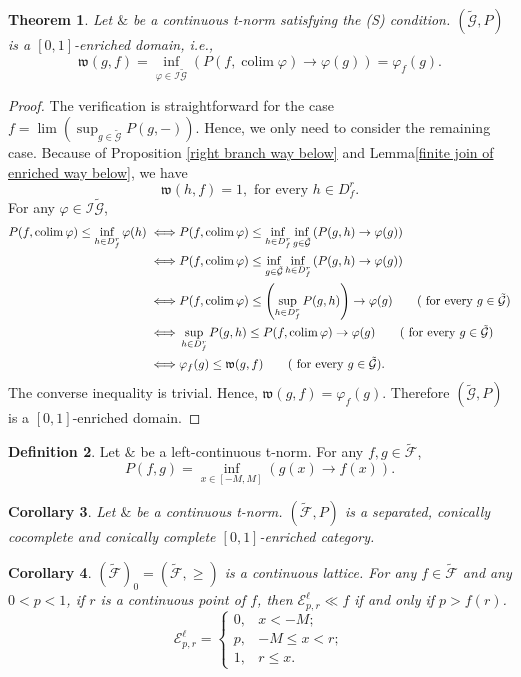 \documentclass[preprint,3p,times]{elsarticle}
\theoremstyle{plain}
\newtheorem{thm}{Theorem}[section]
\newtheorem{cor}[thm]{Corollary}
\theoremstyle{definition}
\newtheorem{definition}[thm]{Definition}
\renewcommand{\phi}{\varphi}
\numberwithin{equation}{section}
\begin{document}
\begin{thm}\label{G is a real enriched domain}
	Let \( \& \) be a continuous t-norm satisfying the (S) condition. \((\tilde{\mathcal{G} },P)\) is a \([0,1]\)-enriched domain, i.e.,
	\[
	\mathfrak{w}(g, f) = \inf_{\phi \in \mathcal{I}\tilde{\mathcal{G} }} \left( P(f, \operatorname{colim} \phi) \to \phi(g) \right)=\phi_f(g).
	\]
\end{thm}
\begin{proof}
	The verification is straightforward for the case \( f = \operatorname{lim} (\sup_{g \in \tilde{\mathcal{G}}} P(g,-)) \). Hence, we only need to consider the remaining case.
Because of Proposition \ref{right branch way below} and Lemma\ref{finite join of enriched way below}, we have \[
  \mathfrak{w} (h,f)=1, \text{ for every } h\in D^r_f. 
  \]
	For any \(\phi \in \mathcal{I}\tilde{\mathcal{G} }\), 
	\begin{align*}
		P(f,\operatorname{colim}\phi)\le \inf_{h\in D_f^r} \phi (h)
		\iff & P(f,\operatorname{colim}\phi)\le \inf_{h\in D_f^r}\inf_{g\in \tilde{\mathcal{G} }}\left(P(g,h) \rightarrow \phi (g)\right)\\
		\iff&P(f,\operatorname{colim}\phi)\le \inf_{g\in \tilde{\mathcal{G} }}\inf_{h\in D_f^r} \left(P(g,h) \rightarrow \phi (g)\right) \\
		\iff&P(f,\operatorname{colim}\phi)\le \left(\sup_{h\in D_f^r} P(g,h) \right)\rightarrow \phi (g) \tag{ for every \(g\in \tilde{\mathcal{G} }\)}\\
		\iff&\sup_{h\in D_f^r} P(g,h) \le P(f,\operatorname{colim}\phi) \rightarrow \phi (g) \tag{ for every \(g\in \tilde{\mathcal{G} }\)} \\
		\iff& \phi_f(g)\le \mathfrak{w}(g, f) \tag{ for every \(g\in \tilde{\mathcal{G} }\)}.
	\end{align*}
	The converse inequality is trivial. Hence,  \(\mathfrak{w}(g, f) =\phi_f(g) \). Therefore \((\tilde{\mathcal{G} },P)\) is a \([0,1]\)-enriched domain.
\end{proof} 
\begin{definition}
	Let  \(\&\) be a  left-continuous t-norm. For any \(f,g\in \tilde{\mathcal{F}}\),
 \[P(f,g)=\inf_{x\in [-M,M]} \left(g(x)\rightarrow f(x)\right).\]
\end{definition}
\begin{cor}
	Let  \(\&\) be a continuous t-norm. \((\tilde{\mathcal{F}},P)\) is a separated, conically cocomplete  and  conically complete \([0,1]\)-enriched category.
\end{cor}
\begin{cor}\label{crisp order in left branch and left branch way below}
	\((\tilde{\mathcal{F}})_0=(\tilde{\mathcal{F}},\ge )\) is a continuous lattice.  For any \(f\in \tilde{\mathcal{F} } \) and any \(0<p<1\), if \(r\) is a continuous point of \(f\), then \(\mathcal{E}^\ell_{p,r}\ll f\) if and only if \( p>f(r)\).
 \[\mathcal{E}^\ell_{p,r}=\begin{cases}
	0, & x<-M;\\
	p, & -M\le x< r;\\
	1, & r\le x.
\end{cases}\]
\end{cor}
\end{document}
